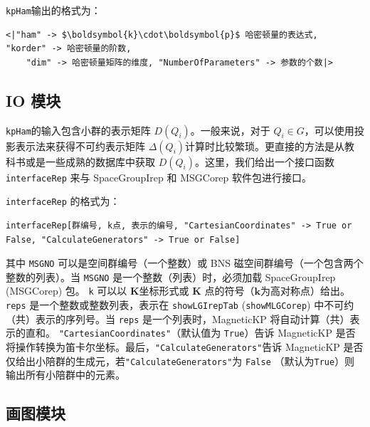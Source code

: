 \documentclass[titlepage,a4paper,12pt,AutoFakeBold]{article}
\begin{document}
\lstinline!kpHam!输出的格式为：
\begin{lstlisting}[backgroundcolor={\color{yellow!5!white}},mathescape=true]
	<|"ham" -> $\boldsymbol{k}\cdot\boldsymbol{p}$ 哈密顿量的表达式,  "korder" -> 哈密顿量的阶数,
	"dim" -> 哈密顿量矩阵的维度, "NumberOfParameters" -> 参数的个数|>
\end{lstlisting}

\subsection{IO 模块}

\lstinline!kpHam!的输入包含小群的表示矩阵 $D(Q_i)$。一般来说，对于 $Q_i\in G$，可以使用投影表示法来获得不可约表示矩阵 $\Delta(Q_i)$计算时比较繁琐。更直接的方法是从教科书或是一些成熟的数据库中获取 $D(Q_i)$。这里，我们给出一个接口函数 \lstinline|interfaceRep| 来与 \textsf{SpaceGroupIrep} 和 \textsf{MSGCorep} 软件包进行接口。

\lstinline|interfaceRep| 的格式为：
\begin{lstlisting}[backgroundcolor={\color{yellow!5!white}},mathescape=true]
	interfaceRep[群编号, k点, 表示的编号, "CartesianCoordinates" -> True or False, "CalculateGenerators" -> True or False]
\end{lstlisting}
其中 \lstinline|MSGNO| 可以是空间群编号（一个整数）或 BNS 磁空间群编号（一个包含两个整数的列表）。当 \lstinline|MSGNO| 是一个整数（列表）时，必须加载 \textsf{SpaceGroupIrep} (\textsf{MSGCorep}) 包。 \lstinline|k| 可以以 $\boldsymbol{K}$坐标形式或 $\boldsymbol{K}$ 点的符号（$\boldsymbol{k}$为高对称点）给出。 \lstinline|reps| 是一个整数或整数列表，表示在 \lstinline|showLGIrepTab| (\lstinline|showMLGCorep|) 中不可约（共）表示的序列号。当 \lstinline|reps| 是一个列表时，\textsf{MagneticKP} 将自动计算（共）表示的直和。 \lstinline|"CartesianCoordinates"|（默认值为 \lstinline|True|）告诉 \textsf{MagneticKP} 是否将操作转换为笛卡尔坐标。最后，\lstinline|"CalculateGenerators"|告诉 \textsf{MagneticKP} 是否仅给出小陪群的生成元，若\lstinline|"CalculateGenerators"|为 \lstinline|False| （默认为\lstinline|True|）则输出所有小陪群中的元素。

\subsection{画图模块}
\end{document}
